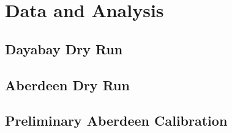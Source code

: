 \chapter {Data and Analysis}
\section {Dayabay Dry Run}
\section {Aberdeen Dry Run}
\section {Preliminary Aberdeen Calibration}
